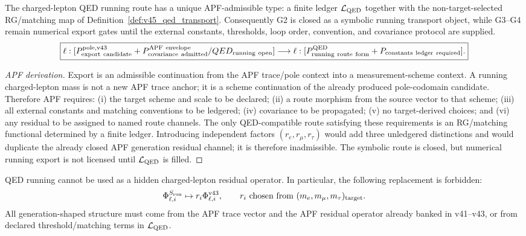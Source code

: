 \begin{theorem}\label{thm:v45_qed_running_route_object}
The charged-lepton QED running route has a unique APF-admissible type: a finite ledger $\mathcal L_{\rm QED}$ together with the non-target-selected RG/matching map of Definition~\ref{def:v45_qed_transport}.  Consequently G2 is closed as a symbolic running transport object, while G3--G4 remain numerical export gates until the external constants, thresholds, loop order, convention, and covariance protocol are supplied.
\[
\boxed{
\ell:[P_{\rm export\ candidate}^{\rm pole,v43}+P_{\rm covariance\ admitted}^{\rm APF\ envelope}/QED_{\rm running\ open}]
\longrightarrow
\ell:[P_{\rm running\ route\ form}^{\rm QED}+P_{\rm constants\ ledger\ required}].
}
\]
\end{theorem}

\begin{proof}[APF derivation]
Export is an admissible continuation from the APF trace/pole context into a measurement-scheme context.  A running charged-lepton mass is not a new APF trace anchor; it is a scheme continuation of the already produced pole-codomain candidate.  Therefore APF requires: (i) the target scheme and scale to be declared; (ii) a route morphism from the source vector to that scheme; (iii) all external constants and matching conventions to be ledgered; (iv) covariance to be propagated; (v) no target-derived choices; and (vi) any residual to be assigned to named route channels.  The only QED-compatible route satisfying these requirements is an RG/matching functional determined by a finite ledger.  Introducing independent factors $(r_e,r_\mu,r_\tau)$ would add three unledgered distinctions and would duplicate the already closed APF generation residual channel; it is therefore inadmissible.  The symbolic route is closed, but numerical running export is not licensed until $\mathcal L_{\rm QED}$ is filled.
\end{proof}

\begin{corollary}\label{cor:v45_no_qed_fitting}
QED running cannot be used as a hidden charged-lepton residual operator.  In particular, the following replacement is forbidden:
\[
\Phi_{\ell,i}^{S_{\rm run}}\mapsto r_i\Phi_{\ell,i}^{\rm v43},\qquad r_i\hbox{ chosen from }(m_e,m_\mu,m_\tau)_{\rm target}.
\]
All generation-shaped structure must come from the APF trace vector and the APF residual operator already banked in v41--v43, or from declared threshold/matching terms in $\mathcal L_{\rm QED}$.
\end{corollary}

